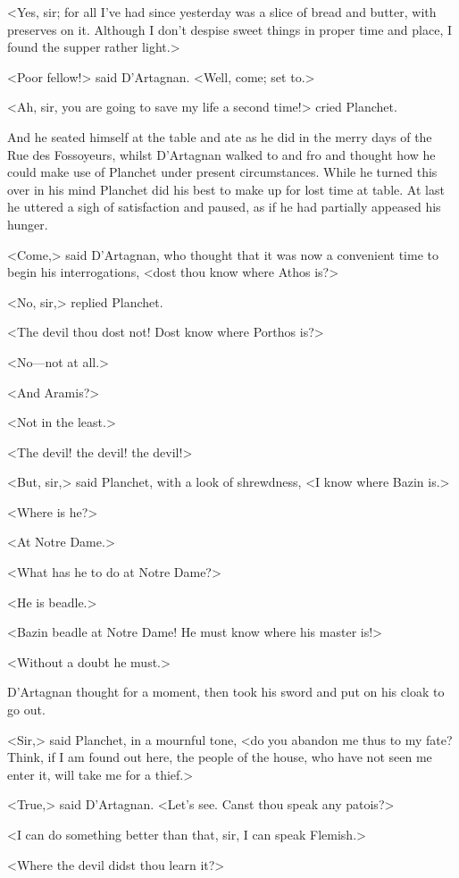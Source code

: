 <Yes, sir; for all I've had since yesterday was a slice of bread and butter, with preserves on it. Although I don't despise sweet things in proper time and place, I found the supper rather light.>

<Poor fellow!> said D'Artagnan. <Well, come; set to.>

<Ah, sir, you are going to save my life a second time!> cried Planchet.

And he seated himself at the table and ate as he did in the merry days of the Rue des Fossoyeurs, whilst D'Artagnan walked to and fro and thought how he could make use of Planchet under present circumstances. While he turned this over in his mind Planchet did his best to make up for lost time at table. At last he uttered a sigh of satisfaction and paused, as if he had partially appeased his hunger.

<Come,> said D'Artagnan, who thought that it was now a convenient time to begin his interrogations, <dost thou know where Athos is?>

<No, sir,> replied Planchet.

<The devil thou dost not! Dost know where Porthos is?>

<No—not at all.>

<And Aramis?>

<Not in the least.>

<The devil! the devil! the devil!>

<But, sir,> said Planchet, with a look of shrewdness, <I know where Bazin is.>

<Where is he?>

<At Notre Dame.>

<What has he to do at Notre Dame?>

<He is beadle.>

<Bazin beadle at Notre Dame! He must know where his master is!>

<Without a doubt he must.>

D'Artagnan thought for a moment, then took his sword and put on his cloak to go out.

<Sir,> said Planchet, in a mournful tone, <do you abandon me thus to my fate? Think, if I am found out here, the people of the house, who have not seen me enter it, will take me for a thief.>

<True,> said D'Artagnan. <Let's see. Canst thou speak any patois?>

<I can do something better than that, sir, I can speak Flemish.>

<Where the devil didst thou learn it?>

